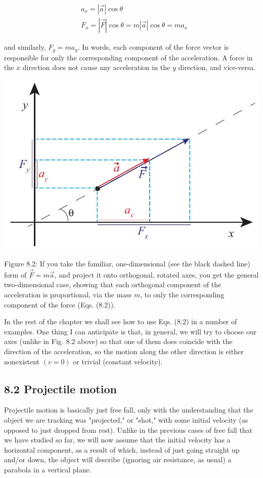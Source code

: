 \documentclass[10pt]{article}
\begin{document}
\begin{align*}
& a_{x}=|\vec{a}| \cos \theta \\
& F_{x}=|\vec{F}| \cos \theta=m|\vec{a}| \cos \theta=m a_{x} \tag{8.3}
\end{align*}


and similarly, $F_{y}=m a_{y}$. In words, each component of the force vector is responsible for only the corresponding component of the acceleration. A force in the $x$ direction does not cause any acceleration in the $y$ direction, and vice-versa.

\begin{center}
\includegraphics[max width=\textwidth]{2024_09_14_9969b06773f10b6936e8g-181}
\end{center}

Figure 8.2: If you take the familiar, one-dimensional (see the black dashed line) form of $\vec{F}=m \vec{a}$, and project it onto orthogonal, rotated axes, you get the general two-dimensional case, showing that each orthogonal component of the acceleration is proportional, via the mass $m$, to only the corresponding component of the force (Eqs. (8.2)).

In the rest of the chapter we shall see how to use Eqs. (8.2) in a number of examples. One thing I can anticipate is that, in general, we will try to choose our axes (unlike in Fig. 8.2 above) so that one of them does coincide with the direction of the acceleration, so the motion along the other direction is either nonexistent $(v=0)$ or trivial (constant velocity).

\subsection*{8.2 Projectile motion}
Projectile motion is basically just free fall, only with the understanding that the object we are tracking was "projected," or "shot," with some initial velocity (as opposed to just dropped from rest). Unlike in the previous cases of free fall that we have studied so far, we will now assume that the initial velocity has a horizontal component, as a result of which, instead of just going straight up and/or down, the object will describe (ignoring air resistance, as usual) a parabola in a vertical plane.
\end{document}
